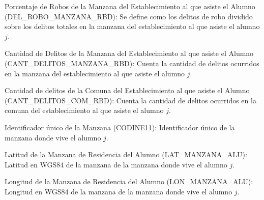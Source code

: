 \begin{longdescription}
\begin{longdescription}
        \item[Porcentaje de Robos de la Manzana del Establecimiento al que asiste el Alumno](DEL\_ROBO\_MANZANA\_RBD):
        Se define como los delitos de robo dividido sobre los delitos totales en la manzana del establecimiento al que asiste el alumno $j$.
        
        \item[Cantidad de Delitos de la Manzana del Establecimiento al que asiste el Alumno](CANT\_DELITOS\_MANZANA\_RBD): Cuenta la cantidad de delitos ocurridos en la manzana del establecimiento al que asiste el alumno $j$.
        
        \item[Cantidad de delitos de la Comuna del Establecimiento al que asiste el Alumno](CANT\_DELITOS\_COM\_RBD): Cuenta la cantidad de delitos ocurridos en la comuna del establecimiento al que asiste el alumno $j$.
        
        \item[Identificador único de la Manzana](CODINE11): Identificador único de la manzana donde vive el alumno $j$.
        
        \item[Latitud de la Manzana de Residencia del Alumno](LAT\_MANZANA\_ALU): Latitud en WGS84 de la manzana de la manzana donde vive el alumno $j$.
        
        \item[Longitud de la Manzana de Residencia del Alumno](LON\_MANZANA\_ALU):
        Longitud en WGS84 de la manzana de la manzana donde vive el alumno $j$.
        
    \end{longdescription}
\end{longdescription}